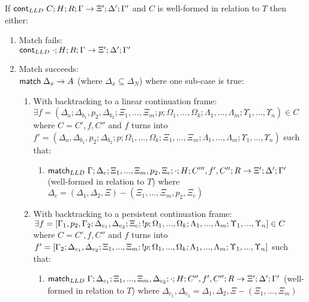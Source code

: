 \begin{lemma}
If $\mathsf{cont}_{LLD} \; C; H; R; \Gamma \rightarrow \Xi'; \Delta'; \Gamma'$ and $C$ is well-formed in relation to $T$ then either:

\begin{enumerate}
   \item Match fails: \\ $\mathsf{cont}_{LLD} \; \cdot; H; R; \Gamma \rightarrow \Xi'; \Delta'; \Gamma'$
   \item Match succeeds: \\ $\mathsf{match} \; \Delta_x \rightarrow A$ (where $\Delta_x \subseteq \Delta_N$) where one sub-case is true:
   \begin{enumerate}
      \item With backtracking to a linear continuation frame: \\ $\exists f = (\Delta_a; \Delta_{b_1}, p_2, \Delta_{b_2}; \Xi_1, ..., \Xi_m; p; \Omega_1, ..., \Omega_k; \Lambda_1, ..., \Lambda_m; \Upsilon_1, ..., \Upsilon_n) \in C$ where $C = C', f, C''$ and $f$ turns into $f' = (\Delta_a, \Delta_{b_1}, p_2; \Delta_{b_2}; p; \Omega_1, ..., \Omega_k; \Xi_1, ..., \Xi_m; \Lambda_1, ..., \Lambda_m; \Upsilon_1, ..., \Upsilon_n)$ such that:
      \begin{enumerate}
         \item $\mathsf{match}_{LLD} \; \Gamma; \Delta_c; \Xi_1, ..., \Xi_m, p_2, \Xi_c; \cdot; H; C''', f', C''; R \rightarrow \Xi'; \Delta'; \Gamma'$ (well-formed in relation to $T$) where $\Delta_c = (\Delta_1, \Delta_2, \Xi) - (\Xi_1, ..., \Xi_m, p_2, \Xi_c)$
      \end{enumerate}
      \item With backtracking to a persistent continuation frame: \\$\exists f = [\Gamma_1, p_2, \Gamma_2; \Delta_{c_1}, \Delta_{c_2}; \Xi_c; {!} p; \Omega_1, ..., \Omega_k; \Lambda_1, ..., \Lambda_m; \Upsilon_1, ..., \Upsilon_n] \in C$ where $C = C', f, C''$ and $f$ turns into $f' = [\Gamma_2; \Delta_{c_1}, \Delta_{c_2}; \Xi_1, ..., \Xi_m; {!} p; \Omega_1, ..., \Omega_k; \Lambda_1, ..., \Lambda_m; \Upsilon_1, ..., \Upsilon_n]$ such that:
      \begin{enumerate}
         \item $\mathsf{match}_{LLD} \; \Gamma; \Delta_{c_1}; \Xi_1, ..., \Xi_m, \Delta_{c_2}; \cdot; H; C'', f', C''; R \rightarrow \Xi'; \Delta'; \Gamma'$ (well-formed in relation to $T$) where $\Delta_{c_1}, \Delta_{c_2} = \Delta_1, \Delta_2, \Xi - (\Xi_1, ..., \Xi_m)$
      \end{enumerate}
   \end{enumerate}
\end{enumerate}
\end{lemma}

